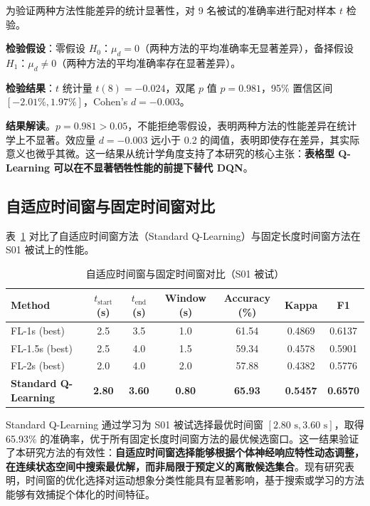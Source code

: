 为验证两种方法性能差异的统计显著性，对 9 名被试的准确率进行配对样本 $t$ 检验\cite{field2013discovering}。

\textbf{检验假设}：零假设 $H_0$：$\mu_d = 0$（两种方法的平均准确率无显著差异），备择假设 $H_1$：$\mu_d \neq 0$（两种方法的平均准确率存在显著差异）。

\textbf{检验结果}：$t$ 统计量 $t(8) = -0.024$，双尾 $p$ 值 $p = 0.981$，95\% 置信区间 $[-2.01\%, 1.97\%]$，Cohen's $d = -0.003$。

\textbf{结果解读}。$p = 0.981 > 0.05$，不能拒绝零假设，表明两种方法的性能差异在统计学上不显著。效应量 $d = -0.003$ 远小于 0.2 的阈值，表明即使存在差异，其实际意义也微乎其微。这一结果从统计学角度支持了本研究的核心主张：\textbf{表格型 Q-Learning 可以在不显著牺牲性能的前提下替代 DQN}。

\subsection{自适应时间窗与固定时间窗对比}
\label{subsec:adaptive_vs_fixed}

表~\ref{tab:adaptive_fixed_s01} 对比了自适应时间窗方法（Standard Q-Learning）与固定长度时间窗方法在 S01 被试上的性能。

\begin{table}[H]
\centering
\caption{自适应时间窗与固定时间窗对比（S01 被试）}
\label{tab:adaptive_fixed_s01}
\small
\begin{tabular}{lcccccc}
\hline
\textbf{Method} & \textbf{$t_{\text{start}}$ (s)} & \textbf{$t_{\text{end}}$ (s)} & \textbf{Window (s)} & \textbf{Accuracy (\%)} & \textbf{Kappa} & \textbf{F1} \\
\hline
FL-1s (best) & 2.5 & 3.5 & 1.0 & 61.54 & 0.4869 & 0.6137 \\
FL-1.5s (best) & 2.5 & 4.0 & 1.5 & 59.34 & 0.4578 & 0.5901 \\
FL-2s (best) & 2.0 & 4.0 & 2.0 & 57.88 & 0.4382 & 0.5776 \\
\textbf{Standard Q-Learning} & \textbf{2.80} & \textbf{3.60} & \textbf{0.80} & \textbf{65.93} & \textbf{0.5457} & \textbf{0.6570} \\
\hline
\end{tabular}
\end{table}

Standard Q-Learning 通过学习为 S01 被试选择最优时间窗 $[2.80\text{ s}, 3.60\text{ s}]$，取得 65.93\% 的准确率，优于所有固定长度时间窗方法的最优候选窗口。这一结果验证了本研究方法的有效性：\textbf{自适应时间窗选择能够根据个体神经响应特性动态调整，在连续状态空间中搜索最优解，而非局限于预定义的离散候选集合}。现有研究表明，时间窗的优化选择对运动想象分类性能具有显著影响，基于搜索或学习的方法能够有效捕捉个体化的时间特征\cite{yang2015time, chen2019dynamic, zhang2021mars}。


